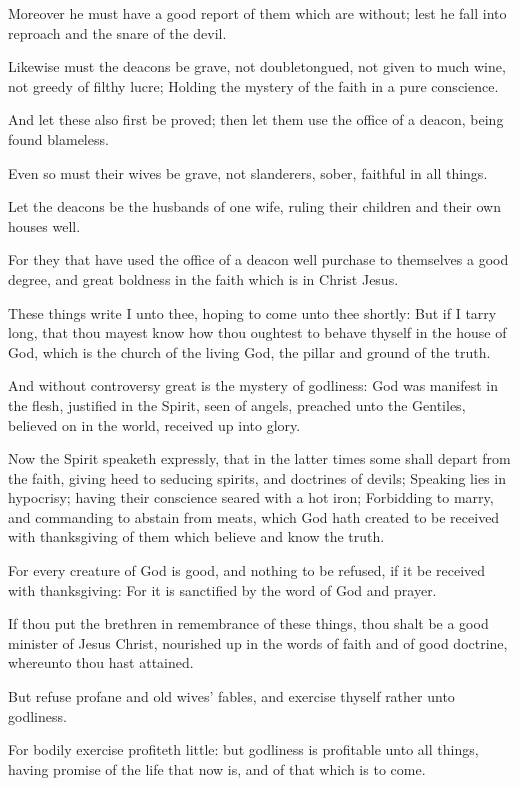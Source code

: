 \Verse Moreover he must have a good report of them which are without; lest he fall into reproach and the snare of the devil.

\Verse Likewise must the deacons be grave, not doubletongued, not given to much wine, not greedy of filthy lucre; \Verse Holding the mystery of the faith in a pure conscience.

\Verse And let these also first be proved; then let them use the office of a deacon, being found blameless.

\Verse Even so must their wives be grave, not slanderers, sober, faithful in all things.

\Verse Let the deacons be the husbands of one wife, ruling their children and their own houses well.

\Verse For they that have used the office of a deacon well purchase to themselves a good degree, and great boldness in the faith which is in Christ Jesus.

\Verse These things write I unto thee, hoping to come unto thee shortly: \Verse But if I tarry long, that thou mayest know how thou oughtest to behave thyself in the house of God, which is the church of the living God, the pillar and ground of the truth.

\Verse And without controversy great is the mystery of godliness: God was manifest in the flesh, justified in the Spirit, seen of angels, preached unto the Gentiles, believed on in the world, received up into glory.


\Chapter
\Verse Now the Spirit speaketh expressly, that in the latter times some shall depart from the faith, giving heed to seducing spirits, and doctrines of devils; \Verse Speaking lies in hypocrisy; having their conscience seared with a hot iron; \Verse Forbidding to marry, and commanding to abstain from meats, which God hath created to be received with thanksgiving of them which believe and know the truth.

\Verse For every creature of God is good, and nothing to be refused, if it be received with thanksgiving: \Verse For it is sanctified by the word of God and prayer.

\Verse If thou put the brethren in remembrance of these things, thou shalt be a good minister of Jesus Christ, nourished up in the words of faith and of good doctrine, whereunto thou hast attained.

\Verse But refuse profane and old wives' fables, and exercise thyself rather unto godliness.

\Verse For bodily exercise profiteth little: but godliness is profitable unto all things, having promise of the life that now is, and of that which is to come.

